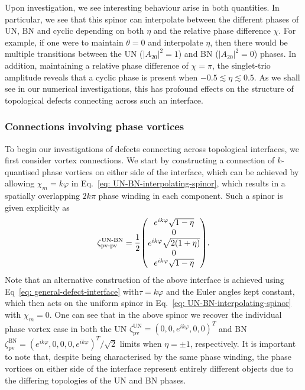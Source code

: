 Upon investigation, we see interesting behaviour arise in both quantities.
In particular, we see that this spinor can interpolate between the different
phases of UN, BN and cyclic depending on both \(\eta \) and the relative phase
difference \(\chi \).
For example, if one were to maintain \(\theta=0\) and interpolate \(\eta \),
then there would be multiple transitions between the UN (\(|A_{20}|^2 = 1\)) and
BN (\(|A_{20}|^2 = 0\)) phases.
In addition, maintaining a relative phase difference of \(\chi=\pi \), the
singlet-trio amplitude reveals that a cyclic phase is present when
\(-0.5 \lesssim \eta \lesssim 0.5\).
As we shall see in our numerical investigations, this has profound effects on
the structure of topological defects connecting across such an interface.

\subsubsection{Connections involving phase vortices}
To begin our investigations of defects connecting across topological interfaces,
we first consider vortex connections.
We start by constructing a connection of \(k\)-quantised phase vortices on
either side of the interface, which can be achieved by allowing
\(\chi_m=k\varphi\) in Eq.~\eqref{eq: UN-BN-interpolating-spinor}, which results
in a spatially overlapping \(2k\pi \) phase winding in each component.
Such a spinor is given explicitly as
\begin{align}\label{eq: UN-BN-SQV-SQV}
    \zeta_\text{pv-pv}^\text{UN-BN} =
    \frac{1}{2}\mqty(
        e^{ik\varphi}\sqrt{1-\eta} \\
        0 \\
        e^{ik\varphi}\sqrt{2(1+\eta)} \\
        0 \\
        e^{ik\varphi}\sqrt{1-\eta}
    ).
\end{align}
Note that an alternative construction of the above interface is achieved using
Eq~\eqref{eq: general-defect-interface} with\(\tau=k\varphi \) and the Euler
angles kept constant, which then acts on the uniform spinor in
Eq.~\eqref{eq: UN-BN-interpolating-spinor} with \(\chi_m=0\).
One can see that in the above spinor we recover the individual phase vortex
case in both the UN \(\zeta^\text{UN}_\text{pv} = {(0,0,e^{ik\varphi},0,0)}^T\)
and BN \(\zeta^\mathrm{BN}_\text{pv} =
{(e^{ik\varphi},0,0,0,e^{ik\varphi})}^T/\sqrt{2}\) limits when \(\eta = \pm 1\),
respectively.
It is important to note that, despite being characterised by the same phase
winding, the phase vortices on either side of the interface represent entirely
different objects due to the differing topologies of the UN and BN phases.

